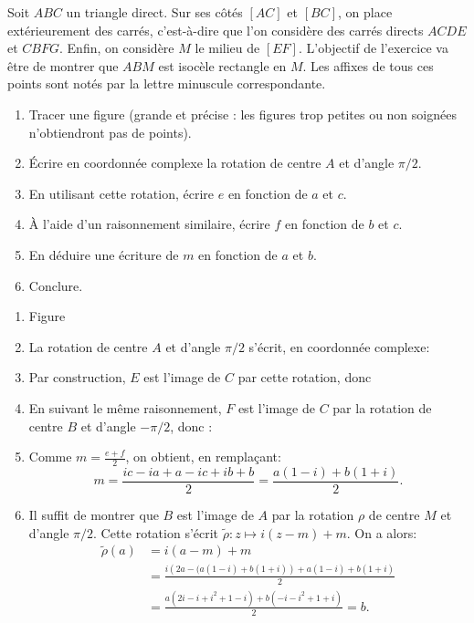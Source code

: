 \begin{exo}
Soit $ABC$ un triangle direct. Sur ses côtés $[AC]$ et $[BC]$, on place extérieurement des carrés, c'est-à-dire que l'on considère des carrés directs $ACDE$ et $CBFG$. Enfin, on considère $M$ le milieu de $[EF]$. L'objectif de l'exercice va être de montrer que $ABM$ est isocèle rectangle en $M$. Les affixes de tous ces points sont notés par la lettre minuscule correspondante.

\begin{enumerate}
\item Tracer une figure (grande et précise : les figures trop petites ou non soignées n'obtiendront pas de points).
\item Écrire en coordonnée complexe la rotation de centre $A$ et d'angle $\pi/2$.
\item En utilisant cette rotation, écrire $e$ en fonction de $a$ et $c$.
\item À l'aide d'un raisonnement similaire, écrire $f$ en fonction de $b$ et $c$.
\item En déduire une écriture de $m$ en fonction de $a$ et $b$.
\item Conclure.
\end{enumerate}
\begin{sol}
\begin{enumerate}
\item Figure
\item La rotation de centre $A$ et d'angle $\pi/2$ s'écrit, en coordonnée complexe: 
\item Par construction, $E$ est l'image de $C$ par cette rotation, donc 
\item En suivant le même raisonnement, $F$ est l'image de $C$ par la rotation de centre $B$ et d'angle $-\pi/2$, donc : 
\item Comme $m=\frac{e+f}{2}$, on obtient, en remplaçant:
\[ m=\frac{ic-ia+a-ic+ib+b}{2} = \boxed{\frac{a(1-i)+b(1+i)}{2}.}\]
\item Il suffit de montrer que $B$ est l'image de $A$ par la rotation $\rho$ de centre $M$ et d'angle $\pi/2$. Cette rotation s'écrit $\tilde\rho : z\mapsto i(z-m)+m$. On a alors:
\begin{align*}
\tilde\rho(a) 
&=i(a-m)+m\\
&= \frac{i\left(2a -(a(1-i)+b(1+i)\right) + a(1-i)+b(1+i) }{2}\\
&= \frac{a(2i-i+i^2+1-i)+b(-i-i^2+1+i)}{2} \boxed{= b.}
\end{align*}


\end{enumerate}
\end{sol}
\end{exo}

